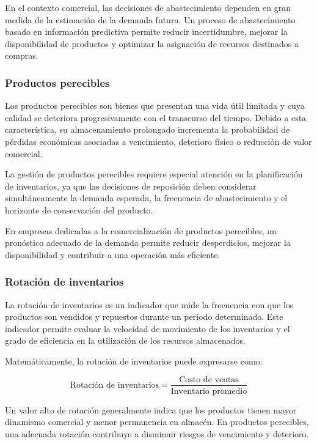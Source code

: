 En el contexto comercial, las decisiones de abastecimiento dependen en gran medida de la estimación de la demanda futura. Un proceso de abastecimiento basado en información predictiva permite reducir incertidumbre, mejorar la disponibilidad de productos y optimizar la asignación de recursos destinados a compras.

\subsubsection{Productos perecibles}

Los productos perecibles son bienes que presentan una vida útil limitada y cuya calidad se deteriora progresivamente con el transcurso del tiempo. Debido a esta característica, su almacenamiento prolongado incrementa la probabilidad de pérdidas económicas asociadas a vencimiento, deterioro físico o reducción de valor comercial.

La gestión de productos perecibles requiere especial atención en la planificación de inventarios, ya que las decisiones de reposición deben considerar simultáneamente la demanda esperada, la frecuencia de abastecimiento y el horizonte de conservación del producto.

En empresas dedicadas a la comercialización de productos perecibles, un pronóstico adecuado de la demanda permite reducir desperdicios, mejorar la disponibilidad y contribuir a una operación más eficiente.


\subsubsection{Rotación de inventarios}

La rotación de inventarios es un indicador que mide la frecuencia con que los productos son vendidos y repuestos durante un período determinado. Este indicador permite evaluar la velocidad de movimiento de los inventarios y el grado de eficiencia en la utilización de los recursos almacenados.\cite{heizer2017operations}

Matemáticamente, la rotación de inventarios puede expresarse como:

\begin{equation}
	\text{Rotación de inventarios} =
	\frac{\text{Costo de ventas}}{\text{Inventario promedio}}
\end{equation}

Un valor alto de rotación generalmente indica que los productos tienen mayor dinamismo comercial y menor permanencia en almacén. En productos perecibles, una adecuada rotación contribuye a disminuir riesgos de vencimiento y deterioro.
